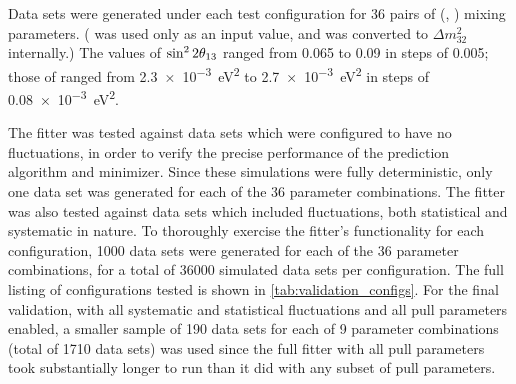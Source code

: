 Data sets were generated under each test configuration
for 36 pairs of (\thetaot{}, \dmee{}) mixing parameters.
(\dmee{} was used only as an input value,
and was converted to $\Delta m^2_{32}$ internally.)
The values of $\sin^22\theta_{13}{}$ ranged from 0.065 to 0.09
in steps of 0.005;
those of \dmee{} ranged from
\SI{2.3e-3}{\eV\squared} to \SI{2.7e-3}{\eV\squared}
in steps of \SI{0.08e-3}{\eV\squared}.

The fitter was tested against data sets
which were configured to have no fluctuations,
in order to verify the precise performance
of the prediction algorithm and minimizer.
Since these simulations were fully deterministic,
only one data set was generated for each of the 36 parameter combinations.
The fitter was also tested against data sets
which included fluctuations, both statistical and systematic in nature.
To thoroughly exercise the fitter's functionality
for each configuration,
1000 data sets were generated
for each of the 36 parameter combinations,
for a total of \num{36000} simulated data sets per configuration.
The full listing of configurations tested
is shown in \cref{tab:validation_configs}.
For the final validation, with all systematic and statistical fluctuations
and all pull parameters enabled,
a smaller sample of 190 data sets for each of 9 parameter combinations
(total of \num{1710} data sets)
was used since the full fitter with all pull parameters
took substantially longer to run than it did with any subset of pull parameters.


